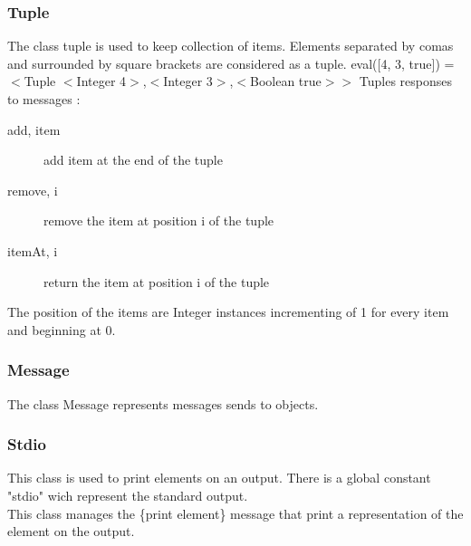 \documentclass{eplDoc}
\begin{document}
\subsubsection{Tuple}
The class tuple is used to keep collection of items.
Elements separated by comas and surrounded by square brackets are considered as a tuple.
eval([4, 3, true]) = $<$Tuple $<$Integer 4$>$,$<$Integer 3$>$,$<$Boolean true$>$$>$
Tuples responses to messages :
\begin{description}
    \item[add, item] add item at the end of the tuple
    \item[remove, i] remove the item at position i of the tuple
    \item[itemAt, i] return the item at position i of the tuple
\end{description}
The position of the items are Integer instances incrementing of 1 for every item and beginning at 0.


\subsubsection{Message}
The class Message represents messages sends to objects.


\subsubsection{Stdio}
This class is used to print elements on an output.  There is a global constant "stdio" wich represent the standard output.  \\
This class manages the \{print element\} message that print a representation of the element on the output.  
\end{document}
